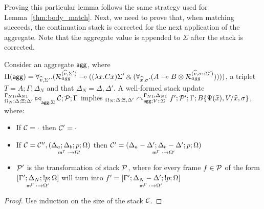 Proving this particular lemma follows the same strategy used for
Lemma~\ref{thm:body_match}. Next, we need to prove that, when matching succeeds,
the continuation stack is corrected for the next application of the aggregate.
Note that the aggregate value is appended to $\Sigma$ after the stack is
corrected.

\begin{theorem}\label{thm:agg_from_update_to_derivation}
Consider an aggregate $\m{agg}$, where $\Pi(\m{agg}) = \forall_{\widehat{v}, \Sigma'}.
   (\defstwo{agg}{\widehat{v}}{\Sigma'} \lolli ((\lambda x. C x)\Sigma' \with (\forall_{\widehat{x}, \sigma}.
                                                (A \lolli B \otimes
                                                 \defstwo{agg}{\widehat{v}}{\sigma
                                                 ::\Sigma'}))))$,
a triplet $T = A; \Gamma; \Delta_{N}$ and that $\Delta_{N} = \Delta,
  \Delta'$.
A well-formed stack update
$\fixstatea{\Delta}{\Xi; \Delta'}{\lstack{C}; \lstack{P}}{\Gamma}{\Sigma}$
implies
$\derstatea{\Delta}{\Xi, \Delta'}{\Gamma_{N1}}{\Delta_{N1}}{V :: \Sigma}{f';
   \lstack{P'}}{B\{\Psi(\widehat{x}), V / \widehat{x}, \sigma\}}$,
where:

\begin{itemize}[leftmargin=*]
   \item If $\lstack{C} = \cdot$ then $\lstack{C'} = \cdot$

   \item If $\lstack{C} = \lstack{C''},
   \lframe{\Delta_a}{\Delta_b}{p}{\Omega}{\cdot}{\Omega'}$
   then $\lstack{C'} = \lframe{\Delta_a - \Delta'}{\Delta_b -
      \Delta'}{p}{\Omega}{\cdot}{\Omega'}$

   \item $\lstack{P'}$ is the transformation of stack $\lstack{P}$, where for every frame $f \in
   \lstack{P}$ of the form $\pframe{\Gamma'}{\Delta_N}{\bang
      p}{\Omega}{\cdot}{\Omega'}$
   will turn into $f' = \pframe{\Gamma'}{\Delta_N-\Delta'}{\bang
      p}{\Omega}{\cdot}{\Omega'}$

\end{itemize}
\end{theorem}
\begin{proof}
Use induction on the size of the stack $\lstack{C}$.
\end{proof}


